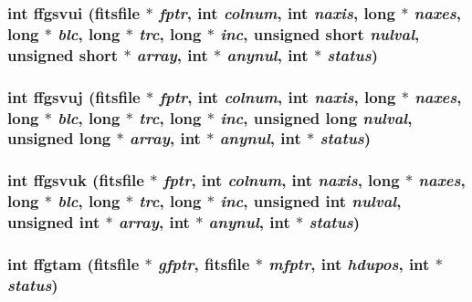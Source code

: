 \subsubsection{\setlength{\rightskip}{0pt plus 5cm}int ffgsvui (\bf{fitsfile} $\ast$ {\em fptr}, int {\em colnum}, int {\em naxis}, long $\ast$ {\em naxes}, long $\ast$ {\em blc}, long $\ast$ {\em trc}, long $\ast$ {\em inc}, unsigned short {\em nulval}, unsigned short $\ast$ {\em array}, int $\ast$ {\em anynul}, int $\ast$ {\em status})}\label{fitsio__64_8h_87ccfd30c50f2289bde69e5d88519f19}


\subsubsection{\setlength{\rightskip}{0pt plus 5cm}int ffgsvuj (\bf{fitsfile} $\ast$ {\em fptr}, int {\em colnum}, int {\em naxis}, long $\ast$ {\em naxes}, long $\ast$ {\em blc}, long $\ast$ {\em trc}, long $\ast$ {\em inc}, unsigned long {\em nulval}, unsigned long $\ast$ {\em array}, int $\ast$ {\em anynul}, int $\ast$ {\em status})}\label{fitsio__64_8h_5216e5258326fde9ddb6bc20a82e1070}


\subsubsection{\setlength{\rightskip}{0pt plus 5cm}int ffgsvuk (\bf{fitsfile} $\ast$ {\em fptr}, int {\em colnum}, int {\em naxis}, long $\ast$ {\em naxes}, long $\ast$ {\em blc}, long $\ast$ {\em trc}, long $\ast$ {\em inc}, unsigned int {\em nulval}, unsigned int $\ast$ {\em array}, int $\ast$ {\em anynul}, int $\ast$ {\em status})}\label{fitsio__64_8h_2c12cc51e3a9ae09a587cad9d58ceb22}


\subsubsection{\setlength{\rightskip}{0pt plus 5cm}int ffgtam (\bf{fitsfile} $\ast$ {\em gfptr}, \bf{fitsfile} $\ast$ {\em mfptr}, int {\em hdupos}, int $\ast$ {\em status})}\label{fitsio__64_8h_ae3ed6cd81ecb5001ff6abb808607eb3}


